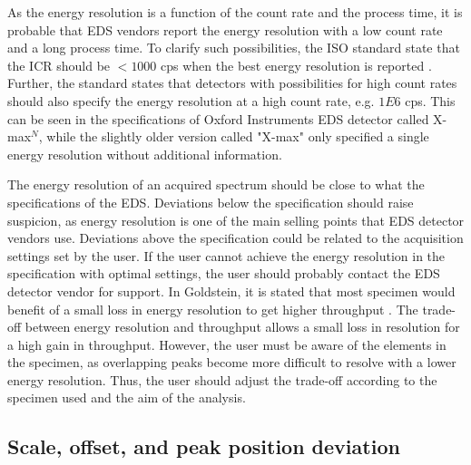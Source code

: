 As the energy resolution is a function of the count rate and the process time, it is probable that EDS vendors report the energy resolution with a low count rate and a long process time.
To clarify such possibilities, the ISO standard state that the ICR should be $< 1000$ cps when the best energy resolution is reported \cite{iso_qc_15632}.
Further, the standard states that detectors with possibilities for high count rates should also specify the energy resolution at a high count rate, e.g. $1E6$ cps.
This can be seen in the specifications of Oxford Instruments EDS detector called X-max$^N$, while the slightly older version called "X-max" only specified a single energy resolution without additional information.


The energy resolution of an acquired spectrum should be close to what the specifications of the EDS.
Deviations below the specification should raise suspicion, as energy resolution is one of the main selling points that EDS detector vendors use.
Deviations above the specification could be related to the acquisition settings set by the user.
If the user cannot achieve the energy resolution in the specification with optimal settings, the user should probably contact the EDS detector vendor for support.
In Goldstein, it is stated that most specimen would benefit of a small loss in energy resolution to get higher throughput \cite[16.3.2]{goldstein_scanning_2018}.
The trade-off between energy resolution and throughput allows a small loss in resolution for a high gain in throughput.
However, the user must be aware of the elements in the specimen, as overlapping peaks become more difficult to resolve with a lower energy resolution.
Thus, the user should adjust the trade-off according to the specimen used and the aim of the analysis.










\subsection{Scale, offset, and peak position deviation}
\label{theory:eds_performance:scaleoffset}


